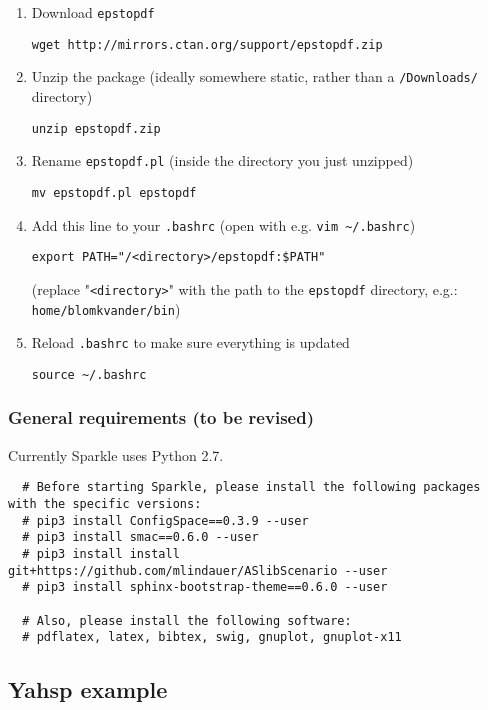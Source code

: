 \documentclass{article}
\begin{document}
\begin{enumerate}
  \item Download \texttt{epstopdf}

  \texttt{wget http://mirrors.ctan.org/support/epstopdf.zip}

  \item Unzip the package (ideally somewhere static, rather than a \texttt{/Downloads/} directory)

  \texttt{unzip epstopdf.zip}

  \item Rename \texttt{epstopdf.pl} (inside the directory you just unzipped)

  \texttt{mv epstopdf.pl epstopdf}

  \item Add this line to your \texttt{.bashrc} (open with e.g. \texttt{vim \~{}/.bashrc})

  \texttt{export PATH="/<directory>/epstopdf:\$PATH"}

  (replace "\texttt{<directory>}" with the path to the \texttt{epstopdf} directory, e.g.: \texttt{home/blomkvander/bin})

  \item Reload \texttt{.bashrc} to make sure everything is updated

  \texttt{source \textasciitilde/.bashrc}
\end{enumerate}

\subsubsection{General requirements (to be revised)}

Currently Sparkle uses Python 2.7.

\begin{verbatim}
  # Before starting Sparkle, please install the following packages with the specific versions:
  # pip3 install ConfigSpace==0.3.9 --user
  # pip3 install smac==0.6.0 --user
  # pip3 install install git+https://github.com/mlindauer/ASlibScenario --user
  # pip3 install sphinx-bootstrap-theme==0.6.0 --user
  
  # Also, please install the following software:
  # pdflatex, latex, bibtex, swig, gnuplot, gnuplot-x11
\end{verbatim}

\subsection{Yahsp example}

\end{document}

